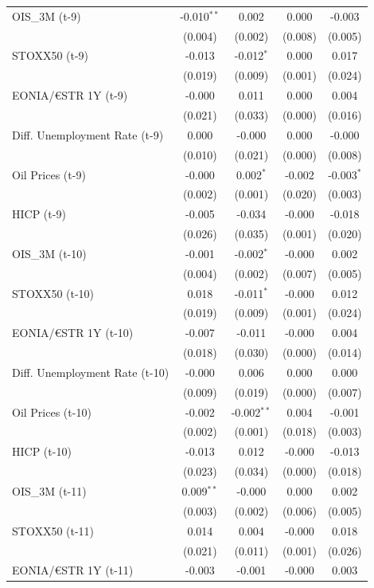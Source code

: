 \begin{longtable}[t]{lcccc}
OIS\_3M (t-9) & -0.010$^{**}$ & 0.002 & 0.000 & -0.003\\
 & (0.004) & (0.002) & (0.008) & (0.005)\\
STOXX50 (t-9) & -0.013 & -0.012$^{*}$ & 0.000 & 0.017\\
 & (0.019) & (0.009) & (0.001) & \vphantom{1} (0.024)\\
EONIA/€STR 1Y (t-9) & -0.000 & 0.011 & 0.000 & 0.004\\
 & (0.021) & (0.033) & (0.000) & (0.016)\\
Diff. Unemployment Rate (t-9) & 0.000 & -0.000 & 0.000 & -0.000\\
 & (0.010) & (0.021) & (0.000) & (0.008)\\
Oil Prices (t-9) & -0.000 & 0.002$^{*}$ & -0.002 & -0.003$^{*}$\\
 & (0.002) & (0.001) & (0.020) & (0.003)\\
HICP (t-9) & -0.005 & -0.034 & -0.000 & -0.018\\
 & (0.026) & (0.035) & (0.001) & (0.020)\\
OIS\_3M (t-10) & -0.001 & -0.002$^{*}$ & -0.000 & 0.002\\
 & (0.004) & (0.002) & (0.007) & (0.005)\\
STOXX50 (t-10) & 0.018 & -0.011$^{*}$ & -0.000 & 0.012\\
 & (0.019) & (0.009) & (0.001) & (0.024)\\
EONIA/€STR 1Y (t-10) & -0.007 & -0.011 & -0.000 & 0.004\\
 & (0.018) & (0.030) & (0.000) & (0.014)\\
Diff. Unemployment Rate (t-10) & -0.000 & 0.006 & 0.000 & 0.000\\
 & (0.009) & (0.019) & (0.000) & (0.007)\\
Oil Prices (t-10) & -0.002 & -0.002$^{**}$ & 0.004 & -0.001\\
 & (0.002) & (0.001) & (0.018) & (0.003)\\
HICP (t-10) & -0.013 & 0.012 & -0.000 & -0.013\\
 & (0.023) & (0.034) & (0.000) & (0.018)\\
OIS\_3M (t-11) & 0.009$^{**}$ & -0.000 & 0.000 & 0.002\\
 & (0.003) & (0.002) & (0.006) & (0.005)\\
STOXX50 (t-11) & 0.014 & 0.004 & -0.000 & 0.018\\
 & (0.021) & (0.011) & (0.001) & (0.026)\\
EONIA/€STR 1Y (t-11) & -0.003 & -0.001 & -0.000 & 0.003\\

\end{longtable}
